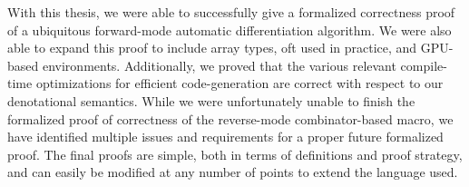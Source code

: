 With this thesis, we were able to successfully give a formalized correctness proof of a ubiquitous forward-mode automatic differentiation algorithm.
We were also able to expand this proof to include array types, oft used in practice, and GPU-based environments.
Additionally, we proved that the various relevant compile-time optimizations for efficient code-generation are correct with respect to our denotational semantics.
While we were unfortunately unable to finish the formalized proof of correctness of the reverse-mode combinator-based macro, we have identified multiple issues and requirements for a proper future formalized proof.
The final proofs are simple, both in terms of definitions and proof strategy, and can easily be modified at any number of points to extend the language used.

